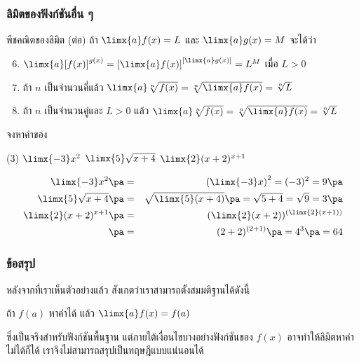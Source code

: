 \begin{frame}
\frametitle{ลิมิตของฟังก์ชันอื่น ๆ}
\begin{prop}{พีชคณิตของลิมิต (ต่อ)}{}
ถ้า $\limx{a} f(x) = L$ และ $\limx{a} g(x) = M$ จะได้ว่า \pa
\begin{enumerate}
\setcounter{enumi}{5}
\item $\limx{a} [f(x)]^{g(x)} = \left[\limx{a} f(x)\right]^{\left[\limx{a} g(x)\right]}  =L^M$ เมื่อ $L > 0$
\item ถ้า $n$ เป็นจำนวนคี่แล้ว $\limx{a} \sqrt[n]{f(x)} = \sqrt[n]{\limx{a} f(x)} = \sqrt[n]{L}$
\item ถ้า $n$ เป็นจำนวนคู่และ $L>0$ แล้ว $\limx{a} \sqrt[n]{f(x)} = \sqrt[n]{\limx{a} f(x)} = \sqrt[n]{L}$
\end{enumerate}
\end{prop}
\end{frame}


\begin{frame}[t]
\begin{ex}
จงหาค่าของ 
\begin{tasks}(3)
\task $\limx{-3} x^2 $
\task $\limx{5} \sqrt{x+4}$
\task $\limx{2} (x+2)^{x+1}$
\end{tasks}
\end{ex}
\begin{sol}
\begin{eqnarray*}
\limx{-3} x^2 \pa &=& \left(\limx{-3} x\right)^2 = (-3)^2 = 9 \pa \\
\limx{5} \sqrt{x+4} \pa &=& \sqrt{\limx{5} (x+4)} \pa = \sqrt{5+4} = \sqrt{9} = 3 \pa \\
\limx{2} (x+2)^{x+1} \pa &=& (\limx{2} (x+2))^{(\limx{2} (x+1))} \\
\pa &=& (2+2)^{(2+1)} \pa = 4^3 \pa = 64
\end{eqnarray*}
\end{sol}
\end{frame}

\begin{frame}
\frametitle{ข้อสรุป}
หลังจากที่เราเห็นตัวอย่างแล้ว สังเกตว่าเราสามารถตั้งสมมติฐานได้ดังนี้
\begin{remark}{}
\begin{center}
ถ้า $f(a)$ หาค่าได้ แล้ว $\limx{a} f(x) = f(a)$
\end{center}
\end{remark}
ซึ่งเป็นจริงสำหรับฟังก์ชันพื้นฐาน แต่ภายใต้เงื่อนไขบางอย่างฟังก์ชันของ $f(x)$ อาจทำให้ลิมิตหาค่าไม่ได้ก็ได้ เราจึงไม่สามารถสรุปเป็นทฤษฎีแบบแน่นอนได้
\end{frame}

